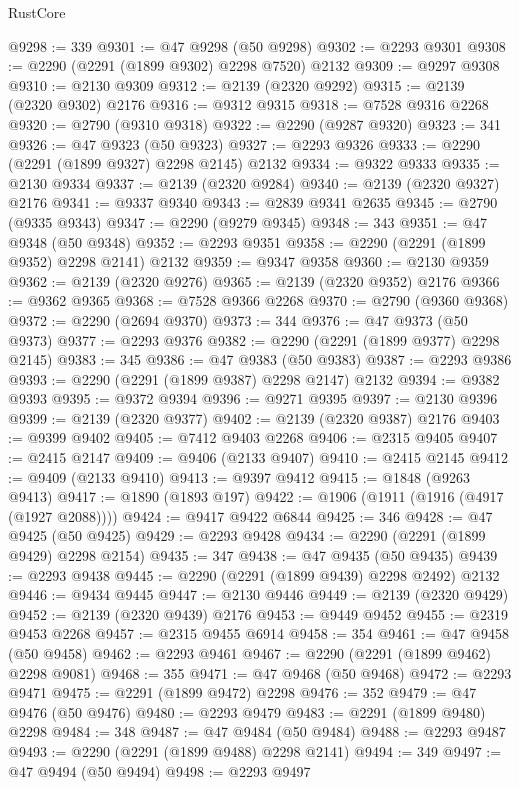 \begin{lexlean}{RustCore}
\begin{coremodule}
@9298 := 339
@9301 := @47 @9298 (@50 @9298)
@9302 := @2293 @9301
@9308 := @2290 (@2291 (@1899 @9302) @2298 @7520) @2132
@9309 := @9297 @9308
@9310 := @2130 @9309
@9312 := @2139 (@2320 @9292)
@9315 := @2139 (@2320 @9302) @2176
@9316 := @9312 @9315
@9318 := @7528 @9316 @2268
@9320 := @2790 (@9310 @9318)
@9322 := @2290 (@9287 @9320)
@9323 := 341
@9326 := @47 @9323 (@50 @9323)
@9327 := @2293 @9326
@9333 := @2290 (@2291 (@1899 @9327) @2298 @2145) @2132
@9334 := @9322 @9333
@9335 := @2130 @9334
@9337 := @2139 (@2320 @9284)
@9340 := @2139 (@2320 @9327) @2176
@9341 := @9337 @9340
@9343 := @2839 @9341 @2635
@9345 := @2790 (@9335 @9343)
@9347 := @2290 (@9279 @9345)
@9348 := 343
@9351 := @47 @9348 (@50 @9348)
@9352 := @2293 @9351
@9358 := @2290 (@2291 (@1899 @9352) @2298 @2141) @2132
@9359 := @9347 @9358
@9360 := @2130 @9359
@9362 := @2139 (@2320 @9276)
@9365 := @2139 (@2320 @9352) @2176
@9366 := @9362 @9365
@9368 := @7528 @9366 @2268
@9370 := @2790 (@9360 @9368)
@9372 := @2290 (@2694 @9370)
@9373 := 344
@9376 := @47 @9373 (@50 @9373)
@9377 := @2293 @9376
@9382 := @2290 (@2291 (@1899 @9377) @2298 @2145)
@9383 := 345
@9386 := @47 @9383 (@50 @9383)
@9387 := @2293 @9386
@9393 := @2290 (@2291 (@1899 @9387) @2298 @2147) @2132
@9394 := @9382 @9393
@9395 := @9372 @9394
@9396 := @9271 @9395
@9397 := @2130 @9396
@9399 := @2139 (@2320 @9377)
@9402 := @2139 (@2320 @9387) @2176
@9403 := @9399 @9402
@9405 := @7412 @9403 @2268
@9406 := @2315 @9405
@9407 := @2415 @2147
@9409 := @9406 (@2133 @9407)
@9410 := @2415 @2145
@9412 := @9409 (@2133 @9410)
@9413 := @9397 @9412
@9415 := @1848 (@9263 @9413)
@9417 := @1890 (@1893 @197)
@9422 := @1906 (@1911 (@1916 (@4917 (@1927 @2088))))
@9424 := @9417 @9422 @6844
@9425 := 346
@9428 := @47 @9425 (@50 @9425)
@9429 := @2293 @9428
@9434 := @2290 (@2291 (@1899 @9429) @2298 @2154)
@9435 := 347
@9438 := @47 @9435 (@50 @9435)
@9439 := @2293 @9438
@9445 := @2290 (@2291 (@1899 @9439) @2298 @2492) @2132
@9446 := @9434 @9445
@9447 := @2130 @9446
@9449 := @2139 (@2320 @9429)
@9452 := @2139 (@2320 @9439) @2176
@9453 := @9449 @9452
@9455 := @2319 @9453 @2268
@9457 := @2315 @9455 @6914
@9458 := 354
@9461 := @47 @9458 (@50 @9458)
@9462 := @2293 @9461
@9467 := @2290 (@2291 (@1899 @9462) @2298 @9081)
@9468 := 355
@9471 := @47 @9468 (@50 @9468)
@9472 := @2293 @9471
@9475 := @2291 (@1899 @9472) @2298
@9476 := 352
@9479 := @47 @9476 (@50 @9476)
@9480 := @2293 @9479
@9483 := @2291 (@1899 @9480) @2298
@9484 := 348
@9487 := @47 @9484 (@50 @9484)
@9488 := @2293 @9487
@9493 := @2290 (@2291 (@1899 @9488) @2298 @2141)
@9494 := 349
@9497 := @47 @9494 (@50 @9494)
@9498 := @2293 @9497

\end{coremodule}
\end{lexlean}
